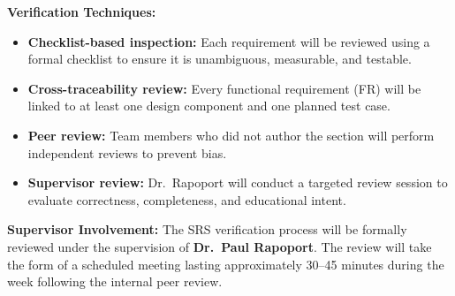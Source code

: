 \documentclass[12pt, titlepage]{article}
\begin{document}
\noindent \textbf{Verification Techniques:}
\begin{itemize}
    \item \textbf{Checklist-based inspection:} Each requirement will be reviewed using a formal checklist to ensure it is unambiguous, measurable, and testable.  
    \item \textbf{Cross-traceability review:} Every functional requirement (FR) will be linked to at least one design component and one planned test case.  
    \item \textbf{Peer review:} Team members who did not author the section will perform independent reviews to prevent bias.  
    \item \textbf{Supervisor review:} Dr.\ Rapoport will conduct a targeted review session to evaluate correctness, completeness, and educational intent.
\end{itemize}

\noindent\textbf{Supervisor Involvement:}  
The SRS verification process will be formally reviewed under the supervision of \textbf{Dr.\ Paul Rapoport}.  
The review will take the form of a scheduled meeting lasting approximately 30--45 minutes during the week following the internal peer review.  
\end{document}
